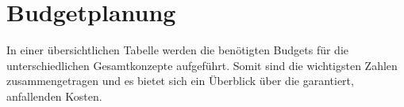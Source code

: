 \section{Budgetplanung}
In einer übersichtlichen Tabelle werden die benötigten Budgets für die unterschiedlichen Gesamtkonzepte aufgeführt. Somit sind die wichtigsten Zahlen zusammengetragen und es bietet sich ein Überblick über die garantiert, anfallenden Kosten.